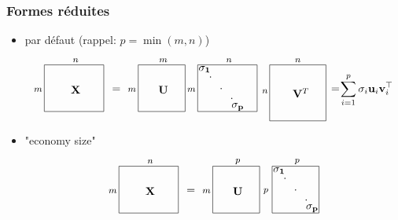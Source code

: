 \documentclass[9pt]{beamer}
\begin{document}
\begin{frame}
\frametitle{Formes réduites}

\begin{itemize}[label=\tiny$\blacksquare$]
	\item par défaut (rappel: $p = \min(m,n)$)
		\[
\raisebox{-0.35\height}{\begin{tikzpicture}[scale=1]
\draw(-3,0.7) node (A) {$\mathbf{X}$};
\draw(-4.2,0.7) node (eq) {\footnotesize ${m}$};
\draw(-3,1.65) node (eq) {\footnotesize ${n}$};
\draw(-4.0,0) rectangle (-2.1,1.5);
\draw(-1.7,0.7) node (eq) {${=}$};


\draw(-1,0) rectangle (0.5,1.5);
\draw(-1.2,0.7) node (eq) {\footnotesize ${m}$};
\draw(-0.2,1.65) node (eq) {\footnotesize ${m}$};
\draw(-0.2,0.7) node (U) {$\mathbf{U}$};

\draw(0.9,0) rectangle (2.8,1.5);
\draw(1.12,1.36) node (S) {$\mathbf{\sigma_1}$};
\draw(1.31,1.1) node (S) {$\mathbf{\cdot}$};
\draw(1.65,0.73) node (S) {$\mathbf{\cdot}$};
\draw(1.99,0.41) node (S) {$\mathbf{\cdot}$};
\draw(2.18,0.15) node (S) {$\mathbf{\sigma_p}$};
\draw(0.7,0.7) node (eq) {\footnotesize ${m}$};
\draw(1.9,1.65) node (eq) {\footnotesize ${n}$};


\draw(3.2,-0.3) rectangle (5,1.5);
\draw(3.05,0.65) node (eq) {\footnotesize ${n}$};
\draw(4.1,1.65) node (eq) {\footnotesize ${n}$};
\draw(4.2,0.6) node (A) {$\mathbf{V}^{T}$};

\draw(5.3,0.7) node (eq) {${=}$};
\draw(6.3,0.7) node (eq) {$\displaystyle \sum_{i=1}^p \sigma_i \mathbf{u}_i\mathbf{v}_i^\top$};


\end{tikzpicture}}
\]
	
	
	\item "economy size"
			\[
\raisebox{-0.35\height}{\begin{tikzpicture}[scale=1]
\draw(-3,0.7) node (A) {$\mathbf{X}$};
\draw(-4.2,0.7) node (eq) {\footnotesize ${m}$};
\draw(-3,1.65) node (eq) {\footnotesize ${n}$};
\draw(-4.0,0) rectangle (-2.1,1.5);
\draw(-1.7,0.7) node (eq) {${=}$};


\draw(-1,0) rectangle (0.5,1.5);
\draw(-1.2,0.7) node (eq) {\footnotesize ${m}$};
\draw(-0.2,1.65) node (eq) {\footnotesize ${p}$};
\draw(-0.2,0.7) node (U) {$\mathbf{U}$};

\draw(0.9,0) rectangle (2.4,1.5);
\draw(1.12,1.36) node (S) {$\mathbf{\sigma_1}$};
\draw(1.31,1.1) node (S) {$\mathbf{\cdot}$};
\draw(1.65,0.73) node (S) {$\mathbf{\cdot}$};
\draw(1.99,0.41) node (S) {$\mathbf{\cdot}$};
\draw(2.18,0.15) node (S) {$\mathbf{\sigma_p}$};
\draw(0.7,0.7) node (eq) {\footnotesize ${p}$};
\draw(1.7,1.65) node (eq) {\footnotesize ${p}$};



\end{tikzpicture}}\]
\end{itemize}
\end{frame}
\end{document}
